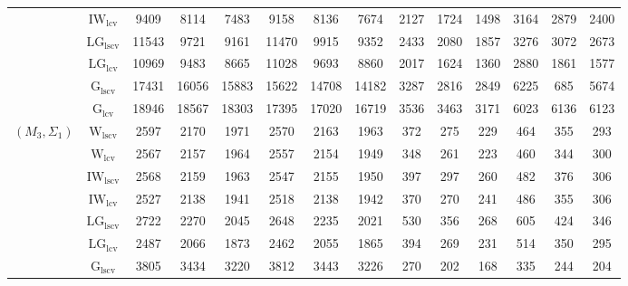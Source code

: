 \begin{table}[!ht]
{\begin{tabular}{@{}cc|ccc|ccc|ccc|ccc@{}}
 & $\mathrm{IW}_{\mathrm{lcv}}$ & \cellcolor{black!30}9409 & \cellcolor{black!30}8114 & \cellcolor{black!30}7483 & \cellcolor{black!30}9158 & \cellcolor{black!10}8136 & \cellcolor{black!10}7674 & 2127 & 1724 & 1498 & 3164 & 2879 & 2400 \\ 
 & $\mathrm{LG}_{\mathrm{lscv}}$ & 11543 & 9721 & 9161 & 11470 & 9915 & 9352 & 2433 & 2080 & 1857 & 3276 & 3072 & 2673 \\ 
 & $\mathrm{LG}_{\mathrm{lcv}}$ & 10969 & 9483 & 8665 & 11028 & 9693 & 8860 & \cellcolor{black!30}2017 & \cellcolor{black!30}1624 & \cellcolor{black!30}1360 & \cellcolor{black!30}2880 & \cellcolor{black!10}1861 & \cellcolor{black!30}1577 \\ 
 & $\mathrm{G}_{\mathrm{lscv}}$ & 17431 & 16056 & 15883 & 15622 & 14708 & 14182 & 3287 & 2816 & 2849 & 6225 & \cellcolor{black!30}685 & 5674 \\ 
 & $\mathrm{G}_{\mathrm{lcv}}$ & 18946 & 18567 & 18303 & 17395 & 17020 & 16719 & 3536 & 3463 & 3171 & 6023 & 6136 & 6123 \\ 
\midrule
$(M_3,\Sigma_1)$ & $\mathrm{W}_{\mathrm{lscv}}$ & 2597 & 2170 & 1971 & 2570 & 2163 & 1963 & 372 & 275 & 229 & 464 & 355 & \cellcolor{black!10}293 \\ 
 & $\mathrm{W}_{\mathrm{lcv}}$ & 2567 & 2157 & 1964 & 2557 & 2154 & 1949 & \cellcolor{black!10}348 & \cellcolor{black!10}261 & \cellcolor{black!10}223 & \cellcolor{black!10}460 & \cellcolor{black!10}344 & 300 \\ 
 & $\mathrm{IW}_{\mathrm{lscv}}$ & 2568 & 2159 & 1963 & 2547 & 2155 & 1950 & 397 & 297 & 260 & 482 & 376 & 306 \\ 
 & $\mathrm{IW}_{\mathrm{lcv}}$ & \cellcolor{black!10}2527 & \cellcolor{black!10}2138 & \cellcolor{black!10}1941 & \cellcolor{black!10}2518 & \cellcolor{black!10}2138 & \cellcolor{black!10}1942 & 370 & 270 & 241 & 486 & 355 & 306 \\ 
 & $\mathrm{LG}_{\mathrm{lscv}}$ & 2722 & 2270 & 2045 & 2648 & 2235 & 2021 & 530 & 356 & 268 & 605 & 424 & 346 \\ 
 & $\mathrm{LG}_{\mathrm{lcv}}$ & \cellcolor{black!30}2487 & \cellcolor{black!30}2066 & \cellcolor{black!30}1873 & \cellcolor{black!30}2462 & \cellcolor{black!30}2055 & \cellcolor{black!30}1865 & 394 & 269 & 231 & 514 & 350 & 295 \\ 
 & $\mathrm{G}_{\mathrm{lscv}}$ & 3805 & 3434 & 3220 & 3812 & 3443 & 3226 & \cellcolor{black!30}270 & \cellcolor{black!30}202 & \cellcolor{black!30}168 & \cellcolor{black!30}335 & \cellcolor{black!30}244 & \cellcolor{black!30}204 \\ 

\end{tabular}}
\end{table}

